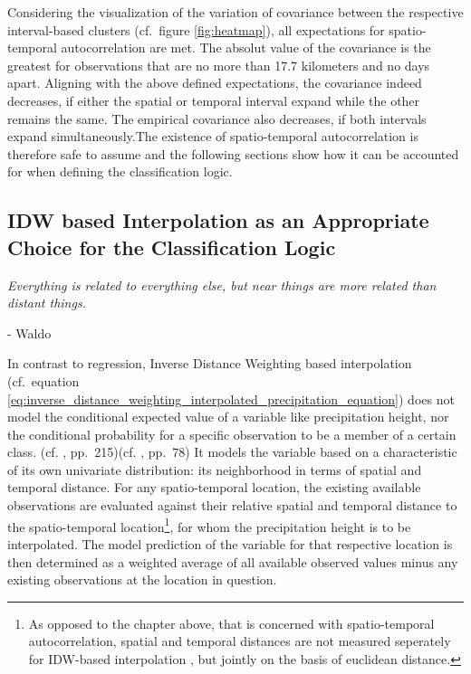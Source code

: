 \documentclass[
  12pt,
]{article}
\begin{document}
Considering the visualization of the variation of covariance between the
respective interval-based clusters (cf.~figure \ref{fig:heatmap}), all
expectations for spatio-temporal autocorrelation are met. The absolut
value of the covariance is the greatest for observations that are no
more than 17.7 kilometers and no days apart. Aligning with the above
defined expectations, the covariance indeed decreases, if either the
spatial or temporal interval expand while the other remains the same.
The empirical covariance also decreases, if both intervals expand
simultaneously.\newline The existence of spatio-temporal autocorrelation
is therefore safe to assume and the following sections show how it can
be accounted for when defining the classification logic.

\hypertarget{idw-based-interpolation-as-an-appropriate-choice-for-the-classification-logic}{%
\subsection{IDW based Interpolation as an Appropriate Choice for the
Classification
Logic}\label{idw-based-interpolation-as-an-appropriate-choice-for-the-classification-logic}}

\begin{flushleft}
\textit{Everything is related to everything else, but near things are more related than distant things.} 
\end{flushleft}

\begin{adjustwidth}{1cm}{0cm}
- Waldo \cite{Tobler.1970}\newline
\end{adjustwidth}

\vspace{-0.75cm}

\begingroup
\justify

In contrast to regression, Inverse Distance Weighting based
interpolation (cf.~equation
\ref{eq:inverse_distance_weighting_interpolated_precipitation_equation})
does not model the conditional expected value of a variable like
precipitation height, nor the conditional probability for a specific
observation to be a member of a certain class. (cf. \citet{Bivand.2013}
, pp.~215)(cf. \citet{Wikle.2019} , pp.~78) It models the variable based
on a characteristic of its own univariate distribution: its neighborhood
in terms of spatial and temporal distance. For any spatio-temporal
location, the existing available observations are evaluated against
their relative spatial and temporal distance to the spatio-temporal
location\footnote{As opposed to the chapter above, that is concerned with spatio-temporal autocorrelation, spatial and temporal distances are not measured seperately for IDW-based interpolation , but jointly on the basis of euclidean distance.},
for whom the precipitation height is to be interpolated. The model
prediction of the variable for that respective location is then
determined as a weighted average of all available observed values minus
any existing observations at the location in question.\newline
\end{document}
